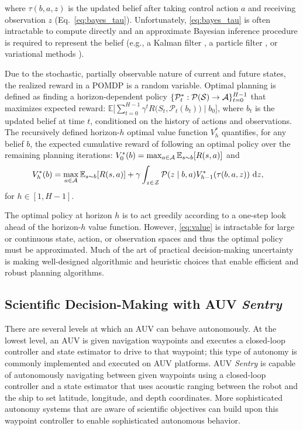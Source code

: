 \noindent where $\tau(b,a,z)$ is the updated belief after taking control action $a$ and receiving observation $z$ (Eq.~\ref{eq:bayes_tau}). Unfortunately, \cref{eq:bayes_tau} is often intractable to compute directly and an approximate Bayesian inference procedure is required to represent the belief (e.g., a Kalman filter \autocite{welch1995introduction}, a particle filter \autocite{Silver2010}, or variational methods \autocite{wainwright2002environmental,kucukelbir2017automatic}). 

Due to the stochastic, partially observable nature of current and future states, the realized reward in a POMDP is a random variable. Optimal planning is defined as finding a horizon-dependent policy $\{\mathcal{P}_t^*: \mathcal{P}(\mathcal{S}) \to \mathcal{A}\}_{t=0}^{H-1}$ that maximizes expected reward: $\mathbb{E} \Big[ \sum_{t=0}^{H-1} \gamma^t R\big(S_t, \mathcal{P}_t(b_t)\big) \mid b_0 \Big]$, where $b_t$ is the updated belief at time $t$, conditioned on the history of actions and observations. The recursively defined horizon-$h$ optimal value function $V^*_h$ quantifies, for any belief $b$, the expected cumulative reward of following an optimal policy over the remaining planning iterations: $V_0^{*}(b) = \operatorname*{max}_{a \in \mathcal{A}} \mathbb{E}_{s \sim b}[R(s, a)]$ and
\begin{align}
    &V_h^{*}(b) =  \max_{a \in \mathcal{A}} \mathbb{E}_{s \sim b}[R(s, a)] + \gamma \int_{z \in \mathcal{Z}} \mathcal{P}(z \mid b, a) V_{h-1}^*(\tau(b, a,z)) \ \text{d}z,
    \label{eq:value}
\end{align}
\noindent for $h \in [1, H-1]$.

The optimal policy at horizon $h$ is to act greedily according to a one-step look ahead of the horizon-$h$ value function. However, \cref{eq:value} is intractable for large or continuous state, action, or observation spaces and thus the optimal policy must be approximated. Much of the art of practical decision-making uncertainty is making well-designed algorithmic and heuristic choices that enable efficient and robust planning algorithms. %



\subsection{Scientific Decision-Making with AUV \emph{Sentry}}
There are several levels at which an AUV can behave autonomously. At the lowest level, an AUV is given navigation waypoints and executes a closed-loop controller and state estimator to drive to that waypoint; this type of autonomy is commonly implemented and executed on AUV platforms. AUV \emph{Sentry} is capable of autonomously navigating between given waypoints using a closed-loop controller and a state estimator that uses acoustic ranging between the robot and the ship to set latitude, longitude, and depth coordinates. More sophisticated autonomy systems that are aware of scientific objectives can build upon this waypoint controller to enable sophisticated autonomous behavior. 

